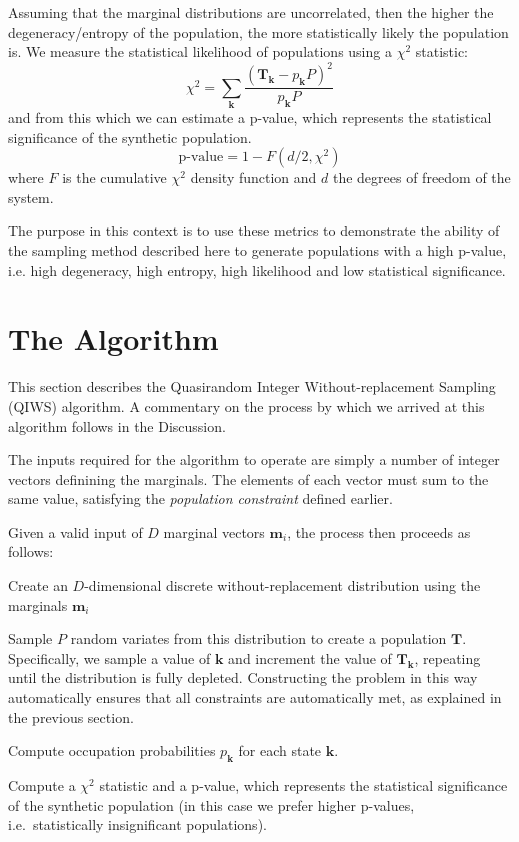 \documentclass{JASSS}
\begin{document}
Assuming that the marginal distributions are uncorrelated, then the
higher the degeneracy/entropy of the population, the more statistically likely
the population is. We measure the statistical likelihood of populations using a \(\chi^2\) statistic:
\begin{equation}
\chi^2 = \sum\limits_{\mathbf{k}}\frac{(\mathbf{T}_\mathbf{k}-p_\mathbf{k}P)^2}{p_\mathbf{k}P}
\label{eqn:chi2}
\end{equation}
and from this which we can estimate a p-value, which represents the statistical
significance of the synthetic population.
\begin{equation}
\text{p-value}=1-F(d/2,\chi^2) 
\end{equation}
where \(F\) is the cumulative
\(\chi^2\) density function and \(d\) the degrees of freedom of the
system. 

The purpose in this context is to use these metrics to demonstrate the ability of the sampling method described here to generate populations with a high p-value, i.e. high degeneracy, high entropy, high likelihood and low statistical significance.

\section{The Algorithm}\label{the-algorithm}

This section describes the Quasirandom Integer Without-replacement Sampling (QIWS) algorithm. A commentary on the process by which we arrived at this algorithm follows in the Discussion.

The inputs required for the algorithm to operate are simply a number of integer vectors definining the marginals. The elements of each vector must sum to the same value, satisfying the \emph{population constraint} defined earlier.

Given a valid input of \(D\) marginal vectors \(\mathbf{m}_i\), the process then proceeds as follows:

\begin{enumerate*}
\item
  Create an \(D\)-dimensional discrete without-replacement distribution
  using the marginals \(\mathbf{m}_i\)
\item
  Sample \(P\) random variates from this distribution to create a
  population \(\mathbf{T}\). Specifically, we sample a value of
  \(\mathbf{k}\) and increment the value of \(\mathbf{T}_\mathbf{k}\),
  repeating until the distribution is fully depleted. Constructing the
  problem in this way automatically ensures that all constraints are
  automatically met, as explained in the previous section.
\item
  Compute occupation probabilities \(p_\mathbf{k}\) for each state
  \(\mathbf{k}\).
\item
  Compute a \(\chi^2\) statistic and a p-value, which represents the
  statistical significance of the synthetic population (in this case we
  prefer higher p-values, i.e.~statistically insignificant populations).
\end{enumerate*}
\end{document}
